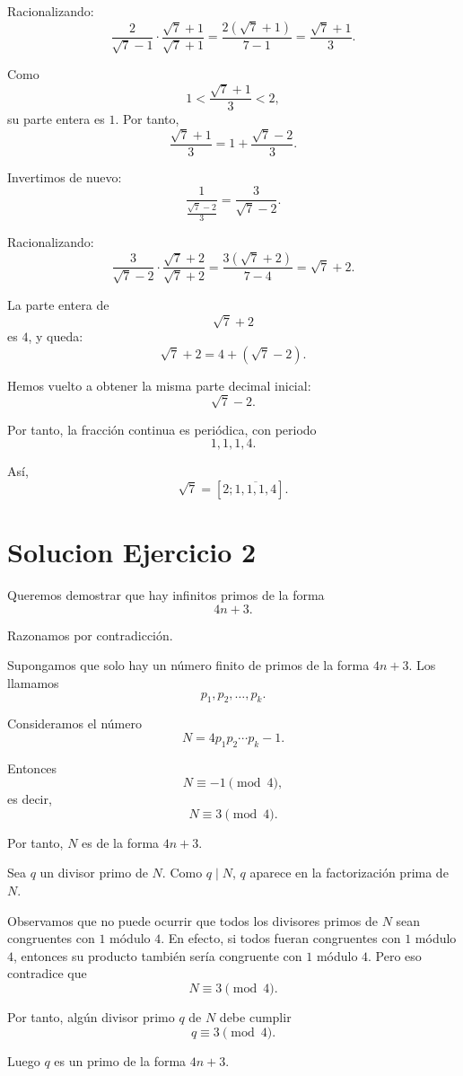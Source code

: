 \documentclass[12pt]{article}
\begin{document}
Racionalizando:
\[
\frac{2}{\sqrt{7}-1}\cdot \frac{\sqrt{7}+1}{\sqrt{7}+1}
=
\frac{2(\sqrt{7}+1)}{7-1}
=
\frac{\sqrt{7}+1}{3}.
\]

Como
\[
1<\frac{\sqrt{7}+1}{3}<2,
\]
su parte entera es \(1\). Por tanto,
\[
\frac{\sqrt{7}+1}{3}
=
1+\frac{\sqrt{7}-2}{3}.
\]

Invertimos de nuevo:
\[
\frac{1}{\frac{\sqrt{7}-2}{3}}
=
\frac{3}{\sqrt{7}-2}.
\]

Racionalizando:
\[
\frac{3}{\sqrt{7}-2}\cdot \frac{\sqrt{7}+2}{\sqrt{7}+2}
=
\frac{3(\sqrt{7}+2)}{7-4}
=
\sqrt{7}+2.
\]

La parte entera de
\[
\sqrt{7}+2
\]
es \(4\), y queda:
\[
\sqrt{7}+2=4+(\sqrt{7}-2).
\]

Hemos vuelto a obtener la misma parte decimal inicial:
\[
\sqrt{7}-2.
\]

Por tanto, la fracción continua es periódica, con periodo
\[
1,1,1,4.
\]

Así,
\[
\boxed{\sqrt{7}=[2;\overline{1,1,1,4}]}.
\]

\section*{Solucion Ejercicio 2}

Queremos demostrar que hay infinitos primos de la forma
\[
4n+3.
\]

Razonamos por contradicción.

Supongamos que solo hay un número finito de primos de la forma \(4n+3\). Los llamamos
\[
p_1,p_2,\dots,p_k.
\]

Consideramos el número
\[
N=4p_1p_2\cdots p_k-1.
\]

Entonces
\[
N\equiv -1\pmod 4,
\]
es decir,
\[
N\equiv 3\pmod 4.
\]

Por tanto, \(N\) es de la forma \(4n+3\).

Sea \(q\) un divisor primo de \(N\). Como \(q\mid N\), \(q\) aparece en la factorización prima de \(N\).

Observamos que no puede ocurrir que todos los divisores primos de \(N\) sean congruentes con \(1\) módulo \(4\). En efecto, si todos fueran congruentes con \(1\) módulo \(4\), entonces su producto también sería congruente con \(1\) módulo \(4\). Pero eso contradice que
\[
N\equiv 3\pmod 4.
\]

Por tanto, algún divisor primo \(q\) de \(N\) debe cumplir
\[
q\equiv 3\pmod 4.
\]

Luego \(q\) es un primo de la forma \(4n+3\).
\end{document}

